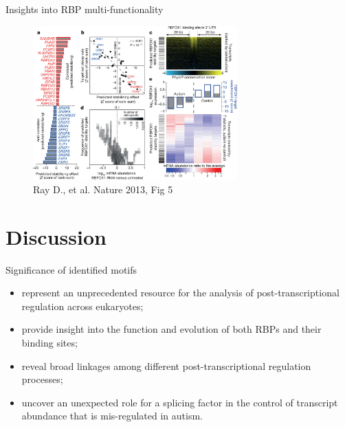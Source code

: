 \documentclass[professionalfont, 12pt, default]{beamer}
\providecommand{\tightlist}{%
    \setlength{\itemsep}{0pt}\setlength{\parskip}{0pt}}
\begin{document}
\begin{frame}{Insights into RBP multi-functionality}

\begin{figure}
\centering
\includegraphics[width=0.70000\textwidth]{img/f5.jpg}
\caption{Ray D., et al. Nature 2013, Fig 5}
\end{figure}

\end{frame}

\section{Discussion}\label{discussion}

\begin{frame}{Significance of identified motifs}

\begin{itemize}
\tightlist
\item
  represent an unprecedented resource for the analysis of
  post-transcriptional regulation across eukaryotes;
\item
  provide insight into the function and evolution of both RBPs and their
  binding sites;
\item
  reveal broad linkages among different post-transcriptional regulation
  processes;
\item
  uncover an unexpected role for a splicing factor in the control of
  transcript abundance that is mis-regulated in autism.
\end{itemize}

\end{frame}
\end{document}
